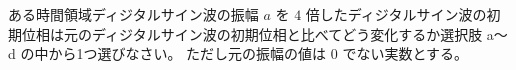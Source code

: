 ある時間領域ディジタルサイン波の振幅 $a$ を $4$ 倍したディジタルサイン波の初期位相は元のディジタルサイン波の初期位相と比べてどう変化するか選択肢 a〜d の中から1つ選びなさい。
ただし元の振幅の値は $0$ でない実数とする。
